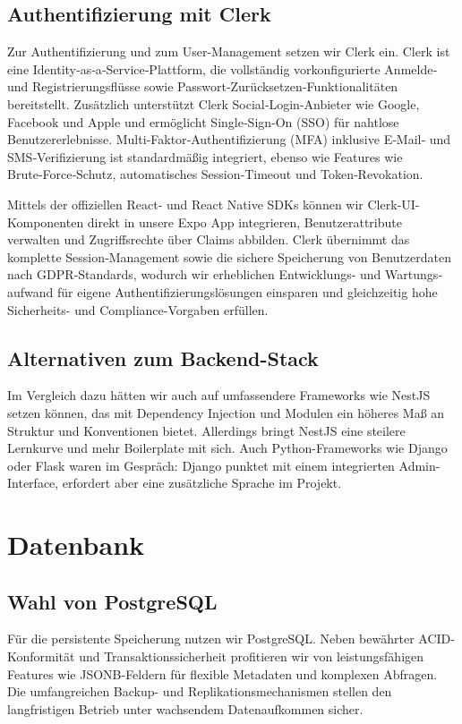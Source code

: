 \documentclass[12pt, a4paper]{report} %
\begin{document}
\subsection{Authentifizierung mit Clerk}
Zur Authentifizierung und zum User-Management setzen wir Clerk ein. Clerk ist eine Identity‑as‑a‑Service‑Plattform, die vollständig vorkonfigurierte Anmelde‑ und Registrierungsflüsse sowie Passwort‑Zurücksetzen‑Funktionalitäten bereitstellt. Zusätzlich unterstützt Clerk Social‑Login‑Anbieter wie Google, Facebook und Apple und ermöglicht Single‑Sign‑On (SSO) für nahtlose Benutzererlebnisse. Multi‑Faktor‑Authentifizierung (MFA) inklusive E‑Mail‑ und SMS‑Verifizierung ist standardmäßig integriert, ebenso wie Features wie Brute‑Force‑Schutz, automatisches Session‑Timeout und Token‑Revokation.

Mittels der offiziellen React- und React Native SDKs können wir Clerk‑UI-Komponenten direkt in unsere Expo App integrieren, Benutzerattribute verwalten und Zugriffsrechte über Claims abbilden. Clerk übernimmt das komplette Session‑Management sowie die sichere Speicherung von Benutzerdaten nach GDPR‑Standards, wodurch wir erheblichen Entwicklungs- und Wartungs­aufwand für eigene Authentifizierungslösungen einsparen und gleichzeitig hohe Sicherheits- und Compliance-Vorgaben erfüllen.

\subsection{Alternativen zum Backend-Stack}
Im Vergleich dazu hätten wir auch auf umfassendere Frameworks wie NestJS setzen können, das mit Dependency Injection und Modulen ein höheres Maß an Struktur und Konventionen bietet. Allerdings bringt NestJS eine steilere Lernkurve und mehr Boilerplate mit sich. Auch Python-Frameworks wie Django oder Flask waren im Gespräch: Django punktet mit einem integrierten Admin-Interface, erfordert aber eine zusätzliche Sprache im Projekt.

\section{Datenbank}
\subsection{Wahl von PostgreSQL}
Für die persistente Speicherung nutzen wir PostgreSQL. Neben bewährter ACID-Konformität und Transaktions­sicherheit profitieren wir von leistungsfähigen Features wie JSONB-Feldern für flexible Metadaten und komplexen Abfragen. Die umfangreichen Backup- und Replikations­mechanismen stellen den langfristigen Betrieb unter wachsendem Datenaufkommen sicher.
\end{document}
